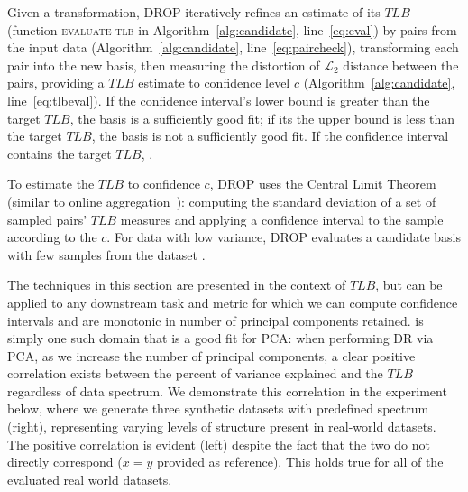 Given a transformation, DROP iteratively refines an estimate of its $TLB$ (function \textsc{evaluate-tlb} in Algorithm~\ref{alg:candidate}, line~\ref{eq:eval}) by  pairs from the input data (Algorithm~\ref{alg:candidate}, line~\ref{eq:paircheck}), transforming each pair into the new basis, then measuring the distortion of $\mathcal{L}_2$ distance between the pairs, providing a $TLB$ estimate to confidence level $c$ (Algorithm~\ref{alg:candidate}, line~\ref{eq:tlbeval}). 
If the confidence interval's lower bound is greater than the target $TLB$, the basis is a sufficiently good fit; if its the upper bound is less than the target $TLB$, the basis is not a sufficiently good fit. 
If the confidence interval contains the target $TLB$,  .

To estimate the $TLB$ to confidence $c$, DROP uses the Central Limit Theorem (similar to online aggregation~\cite{onlineagg}): computing the standard deviation of a set of sampled pairs' $TLB$ measures and applying a confidence interval to the sample according to the $c$.
For data with low variance, DROP evaluates a candidate basis with few samples from the dataset . 

The techniques in this section are presented in the context of $TLB$, but can be applied to any downstream task and metric for which we can compute confidence intervals and are monotonic in number of principal components retained.
 is simply one such domain that is a good fit for PCA: when performing DR via PCA, as we increase the number of principal components, a clear positive correlation exists between the percent of variance explained and the $TLB$ regardless of data spectrum.
We demonstrate this correlation in the experiment below, where we generate three synthetic datasets with predefined spectrum (right), representing varying levels of structure present in real-world datasets. 
The positive correlation is evident (left) despite the fact that the two do not directly correspond ($x=y$ provided as reference). 
This holds true for all of the evaluated real world datasets.

